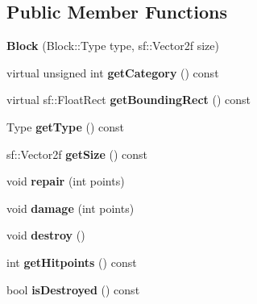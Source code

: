 \subsection*{Public Member Functions}
\begin{DoxyCompactItemize}
\item 
\hypertarget{class_block_a926042ca9b679390293daffe326b78ef}{}{\bfseries Block} (Block\+::\+Type type, sf\+::\+Vector2f size)\label{class_block_a926042ca9b679390293daffe326b78ef}

\item 
\hypertarget{class_block_a3a62a9c4a0e0ff093487cb44a5ed8fa5}{}virtual unsigned int {\bfseries get\+Category} () const \label{class_block_a3a62a9c4a0e0ff093487cb44a5ed8fa5}

\item 
\hypertarget{class_block_ae49c47399c54dfd923af82809f837643}{}virtual sf\+::\+Float\+Rect {\bfseries get\+Bounding\+Rect} () const \label{class_block_ae49c47399c54dfd923af82809f837643}

\item 
\hypertarget{class_block_ab719855e713ba62db29b1a211e12d94a}{}Type {\bfseries get\+Type} () const \label{class_block_ab719855e713ba62db29b1a211e12d94a}

\item 
\hypertarget{class_block_ab898d4e7d6a19056fe25f072a509cac8}{}sf\+::\+Vector2f {\bfseries get\+Size} () const \label{class_block_ab898d4e7d6a19056fe25f072a509cac8}

\item 
\hypertarget{class_block_abd587b2d58bc59094028828ba8fd15ab}{}void {\bfseries repair} (int points)\label{class_block_abd587b2d58bc59094028828ba8fd15ab}

\item 
\hypertarget{class_block_a81cad7086488a30c1cf87171a87708be}{}void {\bfseries damage} (int points)\label{class_block_a81cad7086488a30c1cf87171a87708be}

\item 
\hypertarget{class_block_a27b3bed5a1064d818cd61915f3a380bb}{}void {\bfseries destroy} ()\label{class_block_a27b3bed5a1064d818cd61915f3a380bb}

\item 
\hypertarget{class_block_ae046dec8383917e832d40309f8131075}{}int {\bfseries get\+Hitpoints} () const \label{class_block_ae046dec8383917e832d40309f8131075}

\item 
\hypertarget{class_block_a05fd29b6192dade0b2bf9636d89ef833}{}bool {\bfseries is\+Destroyed} () const \label{class_block_a05fd29b6192dade0b2bf9636d89ef833}

\end{DoxyCompactItemize}
